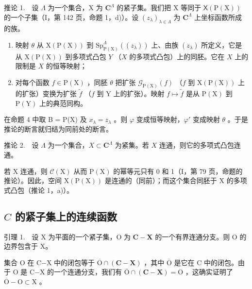 推论 1.　设 \(\Lambda\) 为一个集合，X 为 \(\mathbf{C}^{\Lambda}\) 的紧子集。我们把 X 等同于 \(\mathsf{X}(\mathrm{P}(\mathrm{X}))\) 的一个子集（I，第 142 页，命题 1，d)）。设 \((z_{\lambda})_{\lambda \in \Lambda}\) 为 \(\mathbf{C}^{\Lambda}\) 上坐标函数所成的族。

\begin{enumerate}
\def\labelenumi{\alph{enumi})}
\item
  映射 \(\theta\) 从 \(\mathrm{X}(\mathrm{P}(\mathrm{X}))\) 到 \(\mathrm{Sp}_{\mathrm{P}(\mathrm{X})}^{\Lambda}((z_{\lambda}))\) 上、由族 \((z_{\lambda})\) 所定义，它是从 \(\mathrm{X}(\mathrm{P}(\mathrm{X}))\) 到多项式凸包 \(Y\) （\(X\) 的多项式凸包）上的同胚。它在 \(X\) 上的限制是 \(X\) 的恒等映射；
\item
  对每个函数 \(f \in \mathrm{P}(\mathrm{X})\) ，同胚 \(\theta\) 把扩张 \(\mathcal{G}_{\mathrm{P}(\mathrm{X})}(f)\) （\(f\) 到 \(\mathrm{X}(\mathrm{P}(\mathrm{X}))\) 上的扩张）变换为扩张 \(\widetilde{f}\) （\(f\) 到 \(\mathrm{Y}\) 上的扩张）。映射 \(f \mapsto \widetilde{f}\) 是从 \(\mathrm{P}(\mathrm{X})\) 到 \(\mathrm{P}(\mathrm{Y})\) 上的典范同构。
\end{enumerate}

在命题 4 中取 B = P(X) 及 \(x_{\lambda} = z_{\lambda}\) 。则 \(\varphi\) 变成恒等映射，\(\varphi'\) 变成映射 \(\theta\) 。于是推论的断言就归结为同前处的断言。

推论 2.　设 \(\Lambda\) 为一个集合，\(X \subset \mathbf{C}^{\Lambda}\) 为紧集。若 \(X\) 连通，则它的多项式凸包连通。

若 X 连通，则 \(\mathcal{C}(\mathrm{X})\) 从而 \(\mathrm{P}(\mathrm{X})\) 的幂等元只有 0 和 1（I，第 79 页，命题的推论）。因此，空间 \(\mathrm{X}(\mathrm{P}(\mathrm{X}))\) 是连通的（同前）；而这个集合同胚于 X 的多项式凸包（推论 1，a)）。

\subsection{\texorpdfstring{\(C\) 的紧子集上的连续函数}{C 的紧子集上的连续函数}}

引理 1.　设 X 为平面的一个紧子集，O 为 \(\mathbf{C} - \mathbf{X}\) 的一个有界连通分支。则 O 的边界包含于 X。

集合 O 在 C−X 中的闭包等于 \(\overline{\mathrm{O}}\cap (\mathbf{C} - \mathbf{X})\) ，其中 \(\overline{\mathrm{O}}\) 是它在 C 中的闭包。由于 O 是 C−X 的一个连通分支，我们有 \(\overline{\mathrm{O}}\cap (\mathbf{C} - \mathbf{X}) = \mathrm{O}\) ，这确实证明了 \(\overline{\mathrm{O}} -\mathrm{O}\subset \mathrm{X}\) 。

